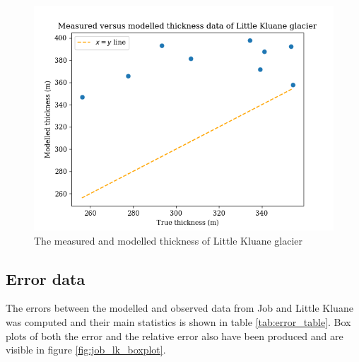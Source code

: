 \documentclass[a4, 12pt]{article}
\begin{document}
\begin{figure}[h!]
\centering
\includegraphics[scale=0.5]{../job_kluane_maps/Little Kluane glacier_xy.png}
\caption{The measured and modelled thickness of Little Kluane glacier}
\label{fig:xy_lk_thickness}
\end{figure}
\subsection{Error data}
The errors between the modelled and observed data from Job and Little Kluane was computed and their main statistics is shown in table \ref{tab:error_table}. Box plots of both  the error and the relative error also have been produced and are visible in figure \ref{fig:job_lk_boxplot}.

\end{document}

